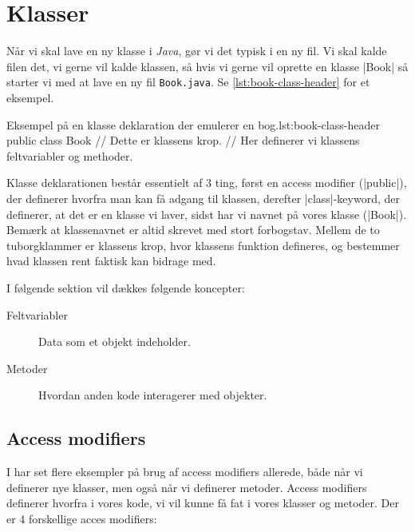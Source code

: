 \section{Klasser}

Når vi skal lave en ny klasse i \emph{Java}, gør vi det typisk i en ny fil.
Vi skal kalde filen det, vi gerne vil kalde klassen, så hvis vi gerne
vil oprette en klasse \JavaInline|Book| så starter vi med at lave en
ny fil \verb|Book.java|. Se \autoref{lst:book-class-header} for et eksempel.

\begin{JavaCode}{Eksempel på en klasse deklaration der emulerer en bog.}{lst:book-class-header}
	public class Book {
		// Dette er klassens krop.
        // Her definerer vi klassens feltvariabler og methoder.
	}
\end{JavaCode}

Klasse deklarationen består essentielt af 3 ting, først en access
modifier (\JavaInline|public|), der definerer hvorfra man kan få
adgang til klassen, derefter \JavaInline|class|-keyword, der definerer,
at det er en klasse vi laver, sidst har vi navnet på vores klasse
(\JavaInline|Book|). Bemærk at klassenavnet er altid skrevet med stort
forbogstav. Mellem de to tuborgklammer er klassens krop, hvor klassens funktion
defineres, og bestemmer hvad klassen rent faktisk kan bidrage med.

I følgende sektion vil dækkes følgende koncepter:

\begin{description}
\item [Feltvariabler]  Data som et objekt indeholder.
\item [Metoder]        Hvordan anden kode interagerer med objekter.
\end{description}

\subsection{Access modifiers}


I har set flere eksempler på brug af access modifiers allerede, både
når vi definerer nye klasser, men også når vi definerer metoder.
Access modifiers definerer hvorfra i vores kode, vi vil kunne få fat i
vores klasser og metoder. Der er 4 forskellige acces modifiers:

